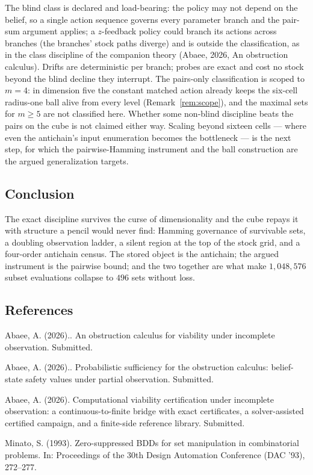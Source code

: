 \documentclass[10pt,twocolumn]{article}
\theoremstyle{plain}
\theoremstyle{definition}
\theoremstyle{remark}
\begin{document}
The blind class is declared and load-bearing: the policy may not
depend on the belief, so a single action sequence governs every
parameter branch and the pair-sum argument applies; a
\(z\)-feedback policy could branch its actions across branches (the
branches' stock paths diverge) and is outside the classification, as in the class discipline of the companion theory (Abaee, 2026, An obstruction calculus). Drifts are
deterministic per branch; probes are exact and cost no stock beyond
the blind decline they interrupt. The pairs-only classification is scoped to
\(m = 4\): in dimension five the constant matched action already
keeps the six-cell radius-one ball alive from every level
(Remark~\ref{rem:scope}), and the maximal sets for \(m \ge 5\) are
not classified here. Whether some non-blind discipline
beats the pairs on the cube is not claimed either way. Scaling beyond
sixteen cells --- where even the antichain's input enumeration becomes
the bottleneck --- is the next step, for which the pairwise-Hamming
instrument and the ball construction are the argued generalization
targets.

\subsection{Conclusion}\label{conclusion}

The exact discipline survives the curse of dimensionality and the
cube repays it with structure a pencil would never find: Hamming
governance of survivable sets, a doubling observation ladder, a
silent region at the top of the stock grid, and a four-order
antichain census. The stored object is the antichain; the argued
instrument is the pairwise bound; and the two together are what make
\(1{,}048{,}576\) subset evaluations collapse to \(496\) sets without
loss.

\subsection*{References}

{\footnotesize
Abaee, A. (2026).. An obstruction calculus for viability under incomplete observation. Submitted.

Abaee, A. (2026).. Probabilistic sufficiency for the obstruction calculus: belief-state safety values under partial observation. Submitted.

Abaee, A. (2026). Computational viability certification under incomplete
observation: a continuous-to-finite bridge with exact certificates, a
solver-assisted certified campaign, and a finite-side reference library.
Submitted.

Minato, S. (1993). Zero-suppressed BDDs for set manipulation in combinatorial problems. In: Proceedings of the 30th Design Automation Conference (DAC '93), 272--277.


}
\end{document}
